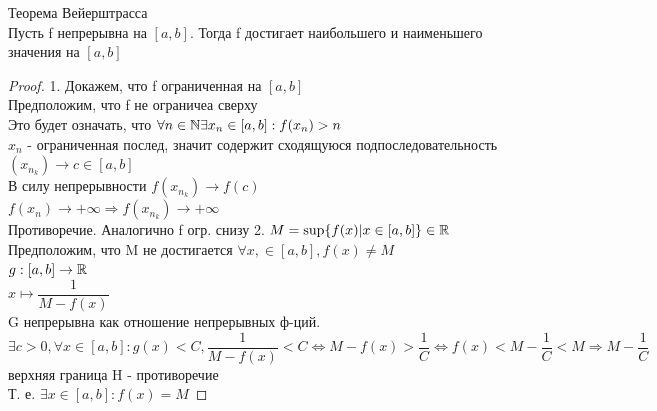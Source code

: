 \begin{theorem}
	Теорема Вейерштрасса\\
	Пусть f непрерывна на $[a, b] $. Тогда f достигает наибольшего и наименьшего значения на $ [a,b]$ 
	\begin{proof}
		1. Докажем, что  f ограниченная на $[a, b] $ \\
		Предположим, что f не ограничеа сверху\\
		Это будет означать, что $ \forall n \in \mathbb{N} \exists x_n \in [a, b]  : f(x_n) > n $ \\
		$x_n$ - ограниченная послед, значит содержит сходящуюся подпоследовательность $ (x_{n_k})  \rightarrow c \in [a, b] $ \\
		В силу непрерывности $ f(x_{n_k}) \rightarrow f(c) $\\
		$ f(x_n) \rightarrow +\infty \Rightarrow f(x_{n_k}) \rightarrow +\infty $\\
		Противоречие. Аналогично f огр. снизу
		2. $ M = \sup \{ f(x) | x \in [a, b]  \} \in \mathbb{R} $ \\
		Предположим, что M не достигается $ \forall x, \in [a, b] , f(x) \neq M $ \\
		$ g : [a, b] \rightarrow \mathbb{R} $ \\
		$ x \mapsto \dfrac{ 1}{M - f(x)} $ \\
		G непрерывна как отношение непрерывных ф-ций.\\
		$ \exists c > 0, \forall x \in [a, b]  : g(x) < C, \dfrac{1}{M - f(x)} < C \Leftrightarrow M - f(x) > \dfrac{ 1}{C} \Leftrightarrow f(x) < M - \dfrac{ 1}{C}  < M \Rightarrow M - \dfrac{1}{C}$ верхняя граница H - противоречие \\
		Т. е. $ \exists x \in [a, b] : f(x) = M $ 
	\end{proof}
\end{theorem}
